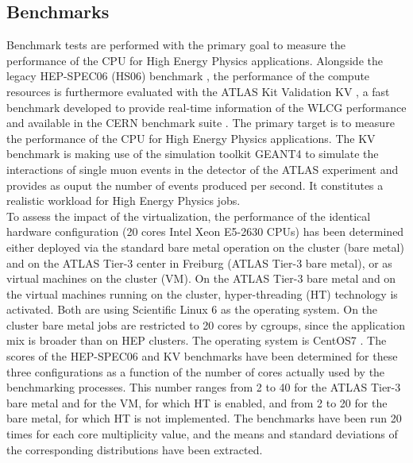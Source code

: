 \subsection{Benchmarks}
Benchmark tests are performed with the primary goal to measure the performance of the CPU for High Energy Physics applications. 
Alongside the legacy HEP-SPEC06 (HS06) benchmark \cite{Hepspec}, the performance of the compute resources is furthermore evaluated with the ATLAS Kit Validation
KV \cite{DeSalvo:2010zza}, a fast benchmark developed to provide real-time information of the WLCG performance and available in the CERN benchmark suite \cite{Alef:2017jyx}.
The primary target is to measure the performance of the CPU for High Energy Physics applications.
The KV benchmark is making use of the simulation toolkit GEANT4 \cite{Agostinelli:2002hh} to simulate the interactions of single muon events in the detector of the ATLAS experiment
and provides as ouput the number of events produced per second. It constitutes a realistic workload for High Energy Physics jobs. \\

To assess the impact of the virtualization, the performance of the identical hardware configuration (20 cores Intel Xeon E5-2630 CPUs) has been determined either deployed via
the standard bare metal operation on the \NEMO cluster (\NEMO bare metal) and on the ATLAS Tier-3 center in Freiburg (ATLAS Tier-3 bare metal), or as virtual machines on the
\NEMO cluster (\NEMO VM). On the ATLAS Tier-3 bare metal and on the virtual machines running on the \NEMO cluster, hyper-threading (HT) technology is activated. Both are using Scientific
Linux 6 \cite{SL6} as the operating system.
On the cluster \NEMO bare metal jobs are restricted to 20 cores by cgroups, since the application mix is broader than on HEP clusters. The operating system is CentOS7 \cite{CentOS7}.
The scores of the HEP-SPEC06 and KV benchmarks have been determined for these three configurations as a function of the number of cores actually used by the benchmarking processes.
This number ranges from 2 to 40 for the ATLAS Tier-3 bare metal and for the \NEMO VM, for which HT is enabled, and from 2 to 20 for the \NEMO bare metal, for which HT is not implemented.
The benchmarks have been run 20 times for each core multiplicity value, and the means and standard deviations of the corresponding distributions have been extracted. \\

